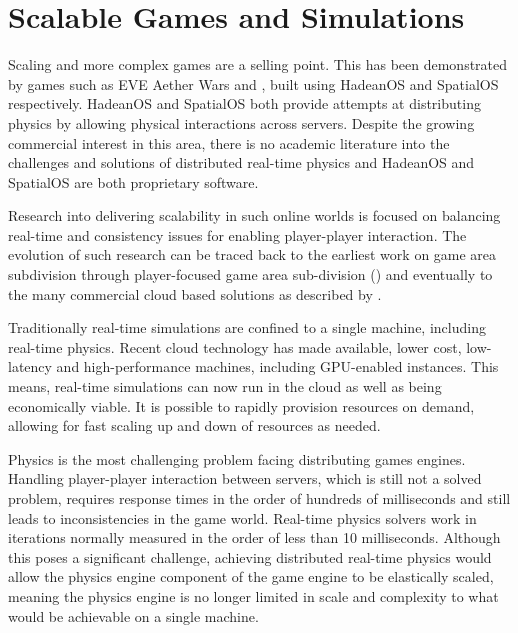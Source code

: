 \section{Scalable Games and Simulations}
Scaling and more complex games are a selling point. This has been demonstrated by games such as EVE Aether Wars \cite{AetherEngine} and \cite{WorldsAd48:online}, built using HadeanOS and SpatialOS respectively. HadeanOS and SpatialOS both provide attempts at distributing physics by allowing physical interactions across servers. Despite the growing commercial interest in this area, there is no academic literature into the challenges and solutions of distributed real-time physics and HadeanOS and SpatialOS are both proprietary software.

Research into delivering scalability in such online worlds is focused on balancing real-time and consistency issues for enabling player-player interaction. The evolution of such research can be traced back to the earliest work on game area subdivision \cite{Npsnet} through player-focused game area sub-division (\cite{Morgan2005InterestManagement, Greenhalgh}) and eventually to the many commercial cloud based solutions as described by \cite{iCloudAccess}.

Traditionally real-time simulations are confined to a single machine, including real-time physics. 
Recent cloud technology has made available, lower cost, low-latency and high-performance machines, including GPU-enabled instances. This means, real-time simulations can now run in the cloud as well as being economically viable. It is possible to rapidly provision resources on demand, allowing for fast scaling up and down of resources as needed.

Physics is the most challenging problem facing distributing games engines. Handling player-player interaction between servers, which is still not a solved problem, requires response times in the order of hundreds of milliseconds and still leads to inconsistencies in the game world. Real-time physics solvers work in iterations normally measured in the order of less than 10 milliseconds. Although this poses a significant challenge, achieving distributed real-time physics would allow the physics engine component of the game engine to be elastically scaled, meaning the physics engine is no longer limited in scale and complexity to what would be achievable on a single machine.


